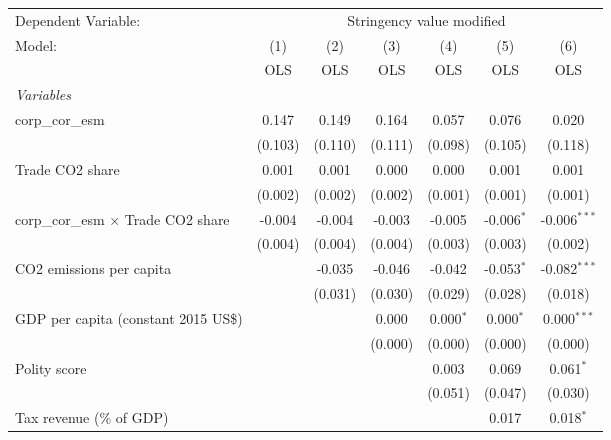 
\begingroup
\centering
\begin{tabular}{lcccccc}
   \toprule
   Dependent Variable: & \multicolumn{6}{c}{Stringency value modified}\\
   Model:                                     & (1)     & (2)     & (3)     & (4)         & (5)          & (6)\\  
                                              &  OLS    & OLS     & OLS     & OLS         & OLS          & OLS\\  
   \midrule
   \emph{Variables}\\
   corp\_cor\_esm                             & 0.147   & 0.149   & 0.164   & 0.057       & 0.076        & 0.020\\   
                                              & (0.103) & (0.110) & (0.111) & (0.098)     & (0.105)      & (0.118)\\   
   Trade CO2 share                            & 0.001   & 0.001   & 0.000   & 0.000       & 0.001        & 0.001\\   
                                              & (0.002) & (0.002) & (0.002) & (0.001)     & (0.001)      & (0.001)\\   
   corp\_cor\_esm $\times$ Trade CO2 share    & -0.004  & -0.004  & -0.003  & -0.005      & -0.006$^{*}$ & -0.006$^{***}$\\   
                                              & (0.004) & (0.004) & (0.004) & (0.003)     & (0.003)      & (0.002)\\   
   CO2 emissions per capita                   &         & -0.035  & -0.046  & -0.042      & -0.053$^{*}$ & -0.082$^{***}$\\   
                                              &         & (0.031) & (0.030) & (0.029)     & (0.028)      & (0.018)\\   
   GDP per capita (constant 2015 US\$)        &         &         & 0.000   & 0.000$^{*}$ & 0.000$^{*}$  & 0.000$^{***}$\\   
                                              &         &         & (0.000) & (0.000)     & (0.000)      & (0.000)\\   
   Polity score                               &         &         &         & 0.003       & 0.069        & 0.061$^{*}$\\   
                                              &         &         &         & (0.051)     & (0.047)      & (0.030)\\   
   Tax revenue (\% of GDP)                    &         &         &         &             & 0.017        & 0.018$^{*}$\\   

\end{tabular}
